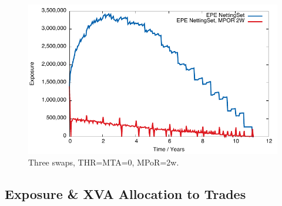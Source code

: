 \documentclass[12pt, a4paper]{article}
\begin{document}

\begin{figure}[hbt]
\begin{center}
\includegraphics[scale=1.0]{example_mpor_epe.pdf}
\end{center}
\caption{Three swaps, THR=MTA=0, MPoR=2w.}
\label{fig_10}
\end{figure}

\subsection{Exposure \& XVA Allocation to Trades}
\end{document}
